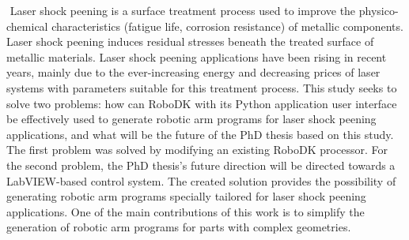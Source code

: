 ﻿%
﻿
Laser shock peening is a surface treatment process used to improve the physico-chemical characteristics (fatigue life, corrosion resistance) of metallic components. Laser shock peening induces residual stresses beneath the treated surface of metallic materials. Laser shock peening applications have been rising in recent years, mainly due to the ever-increasing energy and decreasing prices of laser systems with parameters suitable for this treatment process. This study seeks to solve two problems: how can RoboDK with its Python application user interface be effectively used to generate robotic arm programs for laser shock peening applications, and what will be the future of the PhD thesis based on this study. The first problem was solved by modifying an existing RoboDK processor. For the second problem, the PhD thesis's future direction will be directed towards a LabVIEW-based control system. The created solution provides the possibility of generating robotic arm programs specially tailored for laser shock peening applications. One of the main contributions of this work is to simplify the generation of robotic arm programs for parts with complex geometries.


